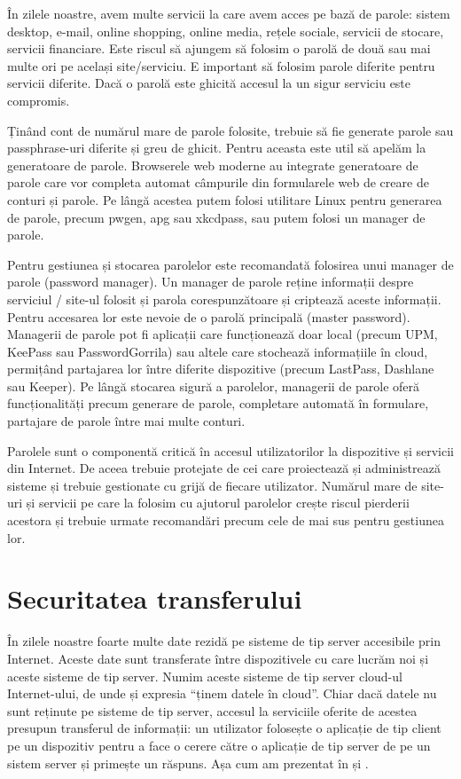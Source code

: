 În zilele noastre, avem multe servicii la care avem acces pe bază de parole: sistem desktop, e-mail, online shopping, online media, rețele sociale, servicii de stocare, servicii financiare. Este riscul să ajungem să folosim o parolă de două sau mai multe ori pe același site/serviciu. E important să folosim parole diferite pentru servicii diferite. Dacă o parolă este ghicită accesul la un sigur serviciu este compromis.

Ținând cont de numărul mare de parole folosite, trebuie să fie generate parole sau passphrase-uri diferite și greu de ghicit. Pentru aceasta este util să apelăm la generatoare de parole. Browserele web moderne au integrate generatoare de parole care vor completa automat câmpurile din formularele web de creare de conturi și parole. Pe lângă acestea putem folosi utilitare Linux pentru generarea de parole, precum pwgen, apg sau xkcdpass, sau putem folosi un manager de parole.

Pentru gestiunea și stocarea parolelor este recomandată folosirea unui manager de parole (password manager). Un manager de parole reține informații despre serviciul / site-ul folosit și parola corespunzătoare și criptează aceste informații. Pentru accesarea lor este nevoie de o parolă principală (master password). Managerii de parole pot fi aplicații care funcționează doar local (precum UPM, KeePass sau PasswordGorrila) sau altele care stochează informațiile în cloud, permițând partajarea lor între diferite dispozitive (precum LastPass, Dashlane sau Keeper). Pe lângă stocarea sigură a parolelor, managerii de parole oferă funcționalități precum generare de parole, completare automată în formulare, partajare de parole între mai multe conturi.

Parolele sunt o componentă critică în accesul utilizatorilor la dispozitive și servicii din Internet. De aceea trebuie protejate de cei care proiectează și administrează sisteme și trebuie gestionate cu grijă de fiecare utilizator. Numărul mare de site-uri și servicii pe care la folosim cu ajutorul parolelor crește riscul pierderii acestora și trebuie urmate recomandări precum cele de mai sus pentru gestiunea lor.

\section{Securitatea transferului}
\label{sec:sec:transfer}

În zilele noastre foarte multe date rezidă pe sisteme de tip server accesibile prin Internet. Aceste date sunt transferate între dispozitivele cu care lucrăm noi și aceste sisteme de tip server. Numim aceste sisteme de tip server cloud-ul Internet-ului, de unde și expresia “ținem datele în cloud”. Chiar dacă datele nu sunt reținute pe sisteme de tip server, accesul la serviciile oferite de acestea presupun transferul de informații: un utilizator folosește o aplicație de tip client pe un dispozitiv pentru a face o cerere către o aplicație de tip server de pe un sistem server și primește un răspuns. Așa cum am prezentat în  și .

